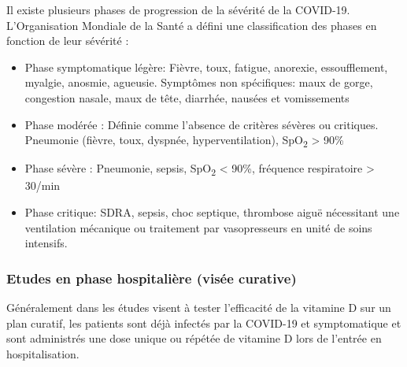 \documentclass[
  a4paper,
  DIV=11,
  numbers=noendperiod,
  listof=totoc]{scrreprt}
\providecommand{\tightlist}{%
  \setlength{\itemsep}{0pt}\setlength{\parskip}{0pt}}\usepackage{longtable,booktabs,array}
\begin{document}
Il existe plusieurs phases de progression de la sévérité de la COVID-19.
L'Organisation Mondiale de la Santé a défini une classification des
phases en fonction de leur sévérité \autocites[
]{WHO.2023.org}{Agarwal.2020} :

\begin{itemize}
\tightlist
\item
  Phase symptomatique légère: Fièvre, toux, fatigue, anorexie,
  essoufflement, myalgie, anosmie, agueusie. Symptômes non spécifiques:
  maux de gorge, congestion nasale, maux de tête, diarrhée, nausées et
  vomissements
\item
  Phase modérée : Définie comme l'absence de critères sévères ou
  critiques. Pneumonie (fièvre, toux, dyspnée, hyperventilation),
  SpO\textsubscript{2} \textgreater{} 90\%
\item
  Phase sévère : Pneumonie, sepsis, SpO\textsubscript{2} \textless{}
  90\%, fréquence respiratoire \textgreater{} 30/min
\item
  Phase critique: \ac{SDRA}, sepsis, choc septique, thrombose aiguë
  nécessitant une ventilation mécanique ou traitement par vasopresseurs
  en unité de soins intensifs.
\end{itemize}

\subsubsection{Etudes en phase hospitalière (visée
curative)}\label{etudes-en-phase-hospitaliuxe8re-visuxe9e-curative}

Généralement dans les études visent à tester l'efficacité de la vitamine
D sur un plan curatif, les patients sont déjà infectés par la COVID-19
et symptomatique et sont administrés une dose unique ou répétée de
vitamine D lors de l'entrée en hospitalisation.
\end{document}
